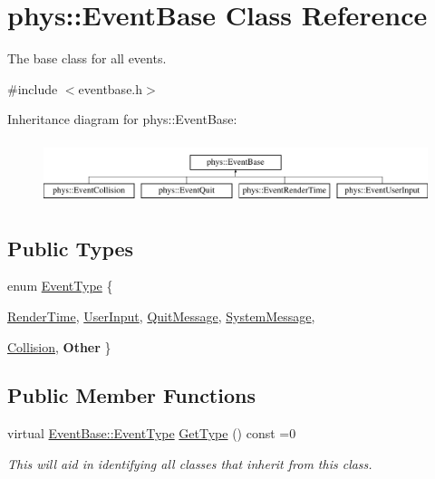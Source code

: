 \hypertarget{classphys_1_1EventBase}{
\section{phys::EventBase Class Reference}
\label{dd/d80/classphys_1_1EventBase}
}


The base class for all events.  




{\ttfamily \#include $<$eventbase.h$>$}

Inheritance diagram for phys::EventBase:\begin{figure}[H]
\begin{center}
\leavevmode
\includegraphics[height=1.84211cm]{dd/d80/classphys_1_1EventBase}
\end{center}
\end{figure}
\subsection*{Public Types}
\begin{DoxyCompactItemize}
\item 
enum \hyperlink{classphys_1_1EventBase_a5e6a8564e127f654123f0bf6a2751923}{EventType} \{ \par
\hyperlink{classphys_1_1EventBase_a5e6a8564e127f654123f0bf6a2751923acdfa47d279e8a1c460d557d14b85c7a5}{RenderTime}, 
\hyperlink{classphys_1_1EventBase_a5e6a8564e127f654123f0bf6a2751923a320cc0817dc2c2201501b12c50c89bef}{UserInput}, 
\hyperlink{classphys_1_1EventBase_a5e6a8564e127f654123f0bf6a2751923a84742ff55e9abdde8f5e0578d30f73a9}{QuitMessage}, 
\hyperlink{classphys_1_1EventBase_a5e6a8564e127f654123f0bf6a2751923a18594400c60af959158e9f5cc2cd5d08}{SystemMessage}, 
\par
\hyperlink{classphys_1_1EventBase_a5e6a8564e127f654123f0bf6a2751923adb6767503168d145497ef65a708725e5}{Collision}, 
{\bfseries Other}
 \}
\end{DoxyCompactItemize}
\subsection*{Public Member Functions}
\begin{DoxyCompactItemize}
\item 
virtual \hyperlink{classphys_1_1EventBase_a5e6a8564e127f654123f0bf6a2751923}{EventBase::EventType} \hyperlink{classphys_1_1EventBase_a1b3d29b6ecf30f18cc3e1825a515c508}{GetType} () const =0
\begin{DoxyCompactList}\small\item\em This will aid in identifying all classes that inherit from this class. \item\end{DoxyCompactList}\end{DoxyCompactItemize}


